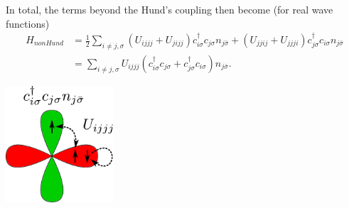 \documentclass[12pt,a4paper]{scrartcl}
\numberwithin{equation}{section}
\begin{document}
In total, the terms beyond the Hund's coupling then become (for real wave functions)
\begin{align}
 H_{nonHund} 
 &= \frac{1}{2}\sum_{i\neq j,\sigma} (U_{ijjj}+U_{jijj})c^{\dagger}_{i\sigma}  c_{j\sigma} n_{j\bar{\sigma}}
                        + (U_{jjij}+U_{jjji})c^{\dagger}_{j\sigma} c_{i\sigma}  n_{j\bar{\sigma}}\\
%
 &= \sum_{i\neq j,\sigma} U_{ijjj} ( c^{\dagger}_{i\sigma}  c_{j\sigma} + c^{\dagger}_{j\sigma} c_{i\sigma} )n_{j\bar{\sigma}}.
\end{align}
\begin{center}
\includegraphics[width=0.3\textwidth]{figs/nonHund/2orb.pdf} 
\end{center}
\end{document}
